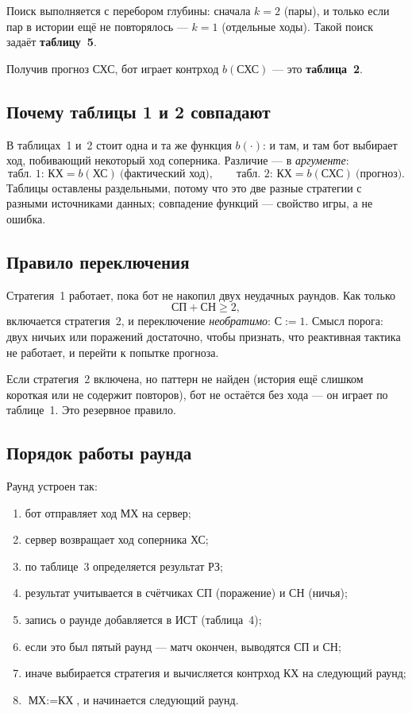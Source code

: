 \documentclass[a4paper,14pt]{extarticle}
\begin{document}
Поиск выполняется с перебором глубины: сначала $k=2$ (пары), и только если пар
в истории ещё не повторялось --- $k=1$ (отдельные ходы). Такой поиск задаёт
\textbf{таблицу~5}.

Получив прогноз СХС, бот играет контрход $b(\text{СХС})$ --- это
\textbf{таблица~2}.

\subsection{Почему таблицы 1 и 2 совпадают}

В таблицах~1 и~2 стоит одна и та же функция $b(\cdot)$: и там, и там бот
выбирает ход, побивающий некоторый ход соперника. Различие --- в
\emph{аргументе}:
\[
\text{табл.~1: } \text{КХ}=b(\text{ХС})\ \text{(фактический ход)},\qquad
\text{табл.~2: } \text{КХ}=b(\text{СХС})\ \text{(прогноз)}.
\]
Таблицы оставлены раздельными, потому что это две разные стратегии с разными
источниками данных; совпадение функций --- свойство игры, а не ошибка.

\subsection{Правило переключения}

Стратегия~1 работает, пока бот не накопил двух неудачных раундов. Как только
\begin{equation}
\text{СП}+\text{СН}\ge 2,
\label{eq:switch}
\end{equation}
включается стратегия~2, и переключение \emph{необратимо}: $\text{С}:=1$.
Смысл порога: двух ничьих или поражений достаточно, чтобы признать, что
реактивная тактика не работает, и перейти к попытке прогноза.

Если стратегия~2 включена, но паттерн не найден (история ещё слишком короткая
или не содержит повторов), бот не остаётся без хода --- он играет по
таблице~1. Это резервное правило.

\subsection{Порядок работы раунда}

Раунд устроен так:
\begin{enumerate}
\item бот отправляет ход МХ на сервер;
\item сервер возвращает ход соперника ХС;
\item по таблице~3 определяется результат РЗ;
\item результат учитывается в счётчиках СП (поражение) и СН (ничья);
\item запись о раунде добавляется в ИСТ (таблица~4);
\item если это был пятый раунд --- матч окончен, выводятся СП и СН;
\item иначе выбирается стратегия и вычисляется контрход КХ на следующий раунд;
\item $\text{МХ}:=\text{КХ}$, и начинается следующий раунд.
\end{enumerate}
\end{document}
